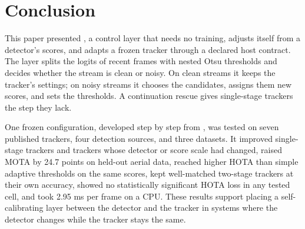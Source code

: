 \section{Conclusion}\label{sec:conclusion}

This paper presented \scl{}, a control layer that needs no training, adjusts
itself from a detector's scores, and adapts a frozen tracker through a
declared host contract. The layer splits the logits of recent frames with
nested Otsu thresholds and decides whether the stream is clean or noisy. On
clean streams it keeps the tracker's settings; on noisy streams it chooses
the candidates, assigns them new scores, and sets the thresholds. A
continuation rescue gives single-stage trackers the step they lack.

One frozen configuration, developed step by step from \aob{}, was tested on
seven published trackers, four detection sources, and three datasets. It
improved single-stage trackers and trackers whose detector or score scale had
changed, raised MOTA by 24.7 points on held-out aerial data, reached higher HOTA than
simple adaptive thresholds on the same scores, kept well-matched two-stage
trackers at their own accuracy, showed no statistically significant HOTA loss
in any tested cell, and took 2.95 ms per frame on a CPU. These results support placing a self-calibrating
layer between the detector and the tracker in systems where the detector
changes while the tracker stays the same.
